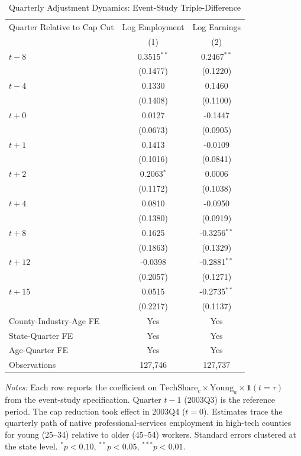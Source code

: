 \begin{table}[htbp]
\centering
\caption{Quarterly Adjustment Dynamics: Event-Study Triple-Difference}
\label{tab:event_study}
\begin{tabular}{lcc}
\toprule
Quarter Relative to Cap Cut & Log Employment & Log Earnings \\
 & (1) & (2) \\
\midrule
$t-8$ & 0.3515$^{**}$ & 0.2467$^{**}$ \\
 & (0.1477) & (0.1220) \\
$t-4$ & 0.1330 & 0.1460 \\
 & (0.1408) & (0.1100) \\
$t+0$ & 0.0127 & -0.1447 \\
 & (0.0673) & (0.0905) \\
$t+1$ & 0.1413 & -0.0109 \\
 & (0.1016) & (0.0841) \\
$t+2$ & 0.2063$^{*}$ & 0.0006 \\
 & (0.1172) & (0.1038) \\
$t+4$ & 0.0810 & -0.0950 \\
 & (0.1380) & (0.0919) \\
$t+8$ & 0.1625 & -0.3256$^{**}$ \\
 & (0.1863) & (0.1329) \\
$t+12$ & -0.0398 & -0.2881$^{**}$ \\
 & (0.2057) & (0.1271) \\
$t+15$ & 0.0515 & -0.2735$^{**}$ \\
 & (0.2217) & (0.1137) \\
\midrule
County-Industry-Age FE & Yes & Yes \\
State-Quarter FE & Yes & Yes \\
Age-Quarter FE & Yes & Yes \\
Observations & 127,746 & 127,737 \\
\bottomrule
\end{tabular}
\begin{tablenotes}[flushleft]
\small
\item \textit{Notes:} Each row reports the coefficient on $\text{TechShare}_c \times \text{Young}_a \times \mathbf{1}(t = \tau)$ from the event-study specification. Quarter $t-1$ (2003Q3) is the reference period. The cap reduction took effect in 2003Q4 ($t=0$). Estimates trace the quarterly path of native professional-services employment in high-tech counties for young (25--34) relative to older (45--54) workers. Standard errors clustered at the state level. $^{*}p<0.10$, $^{**}p<0.05$, $^{***}p<0.01$.
\end{tablenotes}
\end{table}

